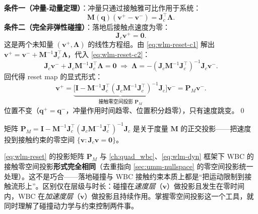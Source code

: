 \begin{derivation}[落地 reset map $\mathbf v^+=\mathbf P_M\mathbf v^-$]
\textbf{条件一（冲量-动量定理）}：冲量只通过接触雅可比作用于系统：
\begin{equation}
  \mathbf M(\mathbf q)(\mathbf v^+-\mathbf v^-)=\mathbf J_c^\top\boldsymbol\Lambda.
  \label{eq:wlm-reset-c1}
\end{equation}
\textbf{条件二（完全非弹性碰撞）}：落地后接触点速度为零：
\begin{equation}
  \mathbf J_c\mathbf v^+=\mathbf0.
  \label{eq:wlm-reset-c2}
\end{equation}
这是两个未知量 $(\mathbf v^+,\boldsymbol\Lambda)$ 的线性方程组。由 \cref{eq:wlm-reset-c1} 解出 $\mathbf v^+=\mathbf v^-+\mathbf M^{-1}\mathbf J_c^\top\boldsymbol\Lambda$，代入 \cref{eq:wlm-reset-c2}：
\begin{equation}
  \mathbf J_c\mathbf v^-+\mathbf J_c\mathbf M^{-1}\mathbf J_c^\top\boldsymbol\Lambda=\mathbf0
  \;\Longrightarrow\;
  \boldsymbol\Lambda=-(\mathbf J_c\mathbf M^{-1}\mathbf J_c^\top)^{-1}\mathbf J_c\mathbf v^-.
\end{equation}
回代得 reset map 的显式形式：
\begin{equation}
  \mathbf v^+=\underbrace{\big[\mathbf I-\mathbf M^{-1}\mathbf J_c^\top(\mathbf J_c\mathbf M^{-1}\mathbf J_c^\top)^{-1}\mathbf J_c\big]}_{\text{接触零空间投影 }\mathbf P_M}\mathbf v^-=\mathbf P_M\mathbf v^-.
  \label{eq:wlm-reset}
\end{equation}
位置不变（$\mathbf q^+=\mathbf q^-$，冲量作用时间趋零、位置积分趋零），只有速度跳变。\qed
\end{derivation}

\noindent 矩阵 $\mathbf P_M=\mathbf I-\mathbf M^{-1}\mathbf J_c^\top(\mathbf J_c\mathbf M^{-1}\mathbf J_c^\top)^{-1}\mathbf J_c$ 是关于度量 $\mathbf M$ 的正交投影——把速度投到接触约束的零空间 $\{\mathbf v:\mathbf J_c\mathbf v=\mathbf0\}$。

\begin{insight}[落地 reset 的投影 $=$ WBC 接触零空间投影]\label{ins:wlm-PM-wbc}
\cref{eq:wlm-reset} 的投影矩阵 $\mathbf P_M$ 与 \cref{ch:quad_wbc}、\cref{eq:wlm-dyn} 框架下 WBC 的接触零空间投影\textbf{形式完全相同}（去重指向 \cref{sec:umm-nullspace} 的零空间投影统一处理）。这不是巧合——落地碰撞与 WBC 接触约束本质上都是“把运动限制到接触流形上”。区别仅在层级与时长：碰撞在\emph{速度层}（$\mathbf v$）做投影且发生在零时间内，WBC 在\emph{加速度层}（$\dot{\mathbf v}$）做投影且持续作用。掌握零空间投影这一个工具，就同时理解了碰撞动力学与约束控制两件事。
\end{insight}

